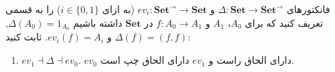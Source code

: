 فانکتورهای $\Delta : \mathbf{Set} \to \mathbf{Set}^\to$ و $ev_i : \mathbf{Set}^\to \to \mathbf{Set}$ (به ازای $i \in \{0, 1\}$) را به قسمی تعریف کنید که برای $A_0$، $A_1$ و $f : A_0 \to A_1$ در $\mathbf{Set}$ داشته باشیم $\Delta (A_0) = 1_{A_0}$, $\Delta (f) = (f, f)$ و $ev_i (f) = A_i$. ثابت کنید:
\begin{enumerate}[label=(\harfi*)]
  \item $ev_1 \dashv \Delta \dashv ev_0$.
  \inlineitem $ev_0$ دارای الحاق راست و $ev_1$ دارای الحاق چپ است.
\end{enumerate}